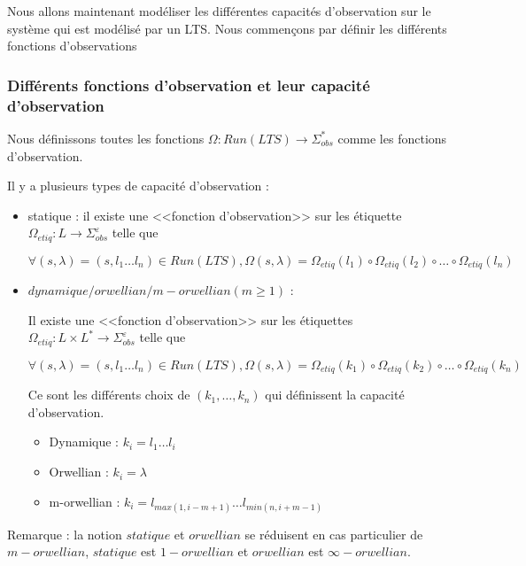 \documentclass[10pt,a4paper]{article}
\begin{document}
Nous allons maintenant mod\'eliser les diff\'erentes capacit\'es d'observation sur le syst\`eme qui est mod\'elis\'e par un LTS. Nous commen\c cons par d\'efinir les diff\'erents fonctions d'observations

\subsubsection{Diff\'erents fonctions d'observation et leur capacit\'e d'observation}

Nous d\'efinissons toutes les fonctions $\Omega : Run(LTS) \rightarrow \Sigma_{obs}^*$ comme les fonctions   
 d'observation.
 
Il y a plusieurs types de capacit\'e d'observation : 



\begin{itemize}
	\item statique : il existe une <<fonction d'observation>> sur les \'etiquette $\Omega_{etiq} : L \rightarrow \Sigma_{obs}^{\varepsilon}$ telle que 
	
	$$\forall (s,\lambda)= (s,l_1\dots l_n) \in Run(LTS), \Omega(s,\lambda) = \Omega_{etiq}(l_1)\circ\Omega_{etiq}(l_2)\circ\dots\circ\Omega_{etiq}(l_n)$$
	\item $dynamique/orwellian/m-orwellian(m\geq 1)$ :
		
		Il existe une <<fonction d'observation>> sur les \'etiquettes $\Omega_{etiq} : L\times L^* \rightarrow \Sigma_{obs}^{\varepsilon}$ telle que 
	
	$$\forall (s,\lambda)= (s,l_1\dots l_n) \in Run(LTS), \Omega(s,\lambda) = \Omega_{etiq}(k_1)\circ\Omega_{etiq}(k_2)\circ\dots\circ\Omega_{etiq}(k_n)$$
	
	Ce sont les diff\'erents choix de $(k_1,\dots, k_n)$ qui d\'efinissent la capacit\'e d'observation.
	
	\begin{itemize}
		\item Dynamique : $k_i = l_1 \dots l_i$
		\item Orwellian : $k_i = \lambda$
		\item m-orwellian : $k_i = l_{max(1,i-m+1)} \dots l_{min(n,i+m-1)}$		
	\end{itemize}
\end{itemize}

	Remarque : la notion $statique$ et $orwellian$ se r\'eduisent en cas particulier de $m-orwellian$, $statique$ est $1-orwellian$ et $orwellian$ est $\infty-orwellian$.
\end{document}
